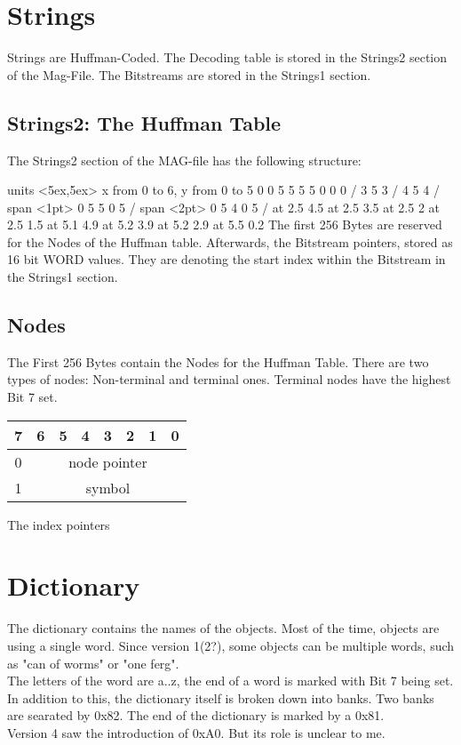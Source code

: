 \documentclass[11pt,twoside,openright]{report}
\begin{document}
\chapter{Strings}
Strings are Huffman-Coded. The Decoding table is stored in the Strings2 section of the Mag-File. The Bitstreams are stored in the Strings1 section.
\section{Strings2: The Huffman Table}
The Strings2 section of the MAG-file has the following structure:

\beginpicture
\setcoordinatesystem units <5ex,5ex>
\setplotarea x from 0 to 6, y from 0 to 5
 0 0 5 5 5 5 0 0 0 /
 3 5 3 /
 4 5 4 /
\setshadegrid span <1pt>
 0 5 5 0 5 /
\setshadegrid span <2pt>
 0 5 4 0 5 /
 at 2.5 4.5
 at 2.5 3.5
 at 2.5 2
 at 2.5 1.5
 at 5.1 4.9
 at 5.2 3.9
 at 5.2 2.9
 at 5.5 0.2
\endpicture
The first 256 Bytes are reserved for the Nodes of the Huffman table. Afterwards, the Bitstream pointers, stored as 16 bit WORD values. They are denoting the start index within the Bitstream in the Strings1 section.
\section{Nodes}
The First 256 Bytes contain the Nodes for the Huffman Table. There are two types of nodes: Non-terminal and terminal ones. Terminal nodes have the highest Bit 7 set.

\begin{tabular}{|c|c|c|c|c|c|c|c|}
\tiny 7&\tiny 6&\tiny 5&\tiny 4&\tiny 3&\tiny 2&\tiny 1&\tiny 0\\\hline
0&\multicolumn{7}{c|}{node pointer}\\\hline
1&\multicolumn{7}{c|}{symbol}\\\hline
\end{tabular}
The index pointers

\chapter{Dictionary}
The dictionary contains the names of the objects. Most of the time, objects are using a single word. Since version 1(2?), some objects can be multiple words, such as "can of worms" or "one ferg".\\
The letters of the word are a..z, the end of a word is marked with Bit 7 being set.\\
In addition to this, the dictionary itself is broken down into banks. Two banks are searated by 0x82. The end of the dictionary is marked by a 0x81.\\
Version 4 saw the introduction of 0xA0. But its role is unclear to me.\\
\end{document}
